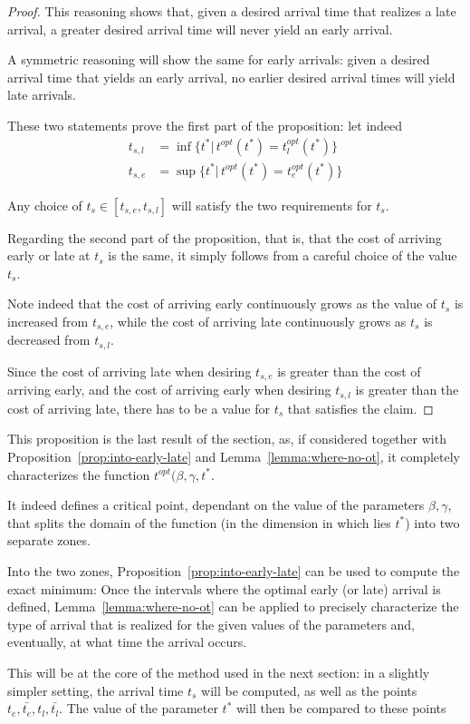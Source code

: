 \begin{proof}
  This reasoning shows that, given a desired arrival time that realizes a late arrival,
  a greater desired arrival time will never yield an early arrival.

  A symmetric reasoning will show the same for early arrivals:
  given a desired arrival time that yields an early arrival,
  no earlier desired arrival times will yield late arrivals.

  These two statements prove the first part of the proposition:
  let indeed
  \begin{align*}
    t_{s, l} & = \inf\{t^* |\, t^{opt}(t^*) = t_l^{opt}(t^*)\} \\
    t_{s, e} & = \sup\{t^* |\, t^{opt}(t^*) = t_e^{opt}(t^*)\}
  \end{align*}

  Any choice of \(t_s \in [t_{s, e}, t_{s, l}]\) will satisfy the two requirements for \(t_s\).

  Regarding the second part of the proposition,
  that is, that the cost of arriving early or late at \(t_s\) is the same,
  it simply follows from a careful choice of the value \(t_s\).

  Note indeed that the cost of arriving early continuously grows as the value of \(t_s\) is increased from \(t_{s, e}\),
  while the cost of arriving late continuously grows as \(t_s\) is decreased from \(t_{s, l}\).

  Since the cost of arriving late when desiring \(t_{s, e}\) is greater than the cost of arriving early,
  and the cost of arriving early when desiring \(t_{s, l}\) is greater than the cost of arriving late,
  there has to be a value for \(t_s\) that satisfies the claim.
\end{proof}

This proposition is the last result of the section,
as, if considered together with Proposition~\ref{prop:into-early-late} and Lemma~\ref{lemma:where-no-ot},
it completely characterizes the function \(t^{opt}(\beta, \gamma, t^*\).

It indeed defines a critical point,
dependant on the value of the parameters \(\beta, \gamma\),
that splits the domain of the function (in the dimension in which lies \(t^*\))
into two separate zones.

Into the two zones, Proposition~\ref{prop:into-early-late} can be used to compute the exact minimum:
Once the intervals where the optimal early (or late) arrival is defined,
Lemma~\ref{lemma:where-no-ot} can be applied to precisely characterize the type of arrival that is realized for the given values of the parameters and,
eventually, at what time the arrival occurs.

This will be at the core of the method used in the next section:
in a slightly simpler setting, the arrival time \(t_s\) will be computed,
as well as the points \(t_e, \bar{t_e}, t_l, \bar{t_l}\).
The value of the parameter \(t^*\) will then be compared to these points

